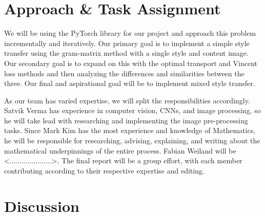 \documentclass[12pt]{article}
\begin{document}
\section{Approach \& Task Assignment}
We will be using the PyTorch library for our project and approach this problem
incrementally and iteratively. Our primary goal is to implement a simple style
transfer using the gram-matrix method with a single style and content image.
Our secondary goal is to expand on this with the optimal transport and Vincent
loss methods and then analyzing the differences and similarities between the
three.  Our final and aspirational goal will be to implement mixed style
transfer.

As our team has varied expertise, we will split the responsibilities
accordingly.  Satvik Verma has experience in computer vision, CNNs, and image
processing, so he will take lead with researching and implementing the image
pre-processing tasks.  Since Mark Kim has the most experience and knowledge of
Mathematics, he will be responsible for researching, advising, explaining, and
writing about the mathematical underpinnings of the entire process.  Fabian
Weiland will be \textless.....................\textgreater.  The final report will be a group
effort, with each member contributing according to their respective expertise
and editing. 

\section{Discussion}
\end{document}
